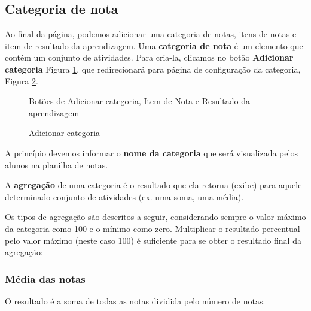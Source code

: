 \subsection{Categoria de nota}
Ao final da página, podemos adicionar uma categoria de notas, itens de notas e item de resultado da aprendizagem. Uma \textbf{categoria de nota} é um elemento que contém um conjunto de atividades. Para cria-la, clicamos no botão \textbf{Adicionar categoria} Figura \ref{fig:cap6_3}, que redirecionará para página de configuração da categoria, Figura \ref{fig:cap6_4}.

\begin{figure}[htbp]
 \begin{center}
  \caption{Botões de Adicionar categoria, Item de Nota e Resultado da aprendizagem}
  \label{fig:cap6_3}
 \end{center}
\end{figure}

\begin{figure}[htbp]
 \begin{center}
  \caption{Adicionar categoria}
  \label{fig:cap6_4}
 \end{center}
\end{figure}

A princípio devemos informar o \textbf{nome da categoria} que será visualizada pelos alunos na planilha de notas.

A \textbf{agregação} de uma categoria é o resultado que ela retorna (exibe) para aquele determinado conjunto de atividades (ex. uma soma, uma média).

Os tipos de agregação são descritos a seguir, considerando sempre o valor máximo da categoria como 100 e o mínimo como zero. Multiplicar o resultado percentual pelo valor máximo (neste caso 100) é suficiente para se obter o resultado final da agregação:

\subsubsection{Média das notas}
O resultado é a soma de todas as notas dividida pelo número de notas.

